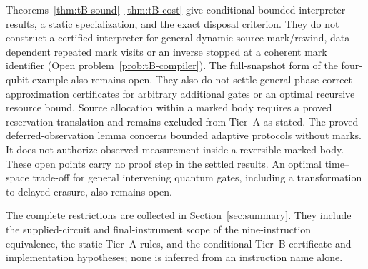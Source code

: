 \begin{remark}\label{problem:remaining}
Theorems~\ref{thm:tB-sound}--\ref{thm:tB-cost} give conditional bounded
interpreter results, a static specialization, and the exact disposal
criterion. They do not construct a certified interpreter for general
dynamic source mark/rewind, data-dependent repeated mark visits or an
inverse stopped at a coherent mark identifier
(Open problem~\ref{prob:tB-compiler}). The full-snapshot form of the
four-qubit example also remains open.
They also do not settle general phase-correct approximation certificates
for arbitrary additional gates or an optimal recursive resource bound.
Source allocation within a marked body requires a proved reservation
translation and remains excluded from Tier~A as stated.
The proved deferred-observation lemma concerns bounded adaptive protocols
without marks. It does not authorize observed measurement inside a
reversible marked body.
These open points carry no proof step in the settled results.
An optimal time--space trade-off for general intervening quantum gates,
including a transformation to delayed erasure, also remains open.
\end{remark}

\begin{remark}\label{rem:r3-restrictions}
The complete restrictions are collected in Section~\ref{sec:summary}.
They include the supplied-circuit and final-instrument scope of the
nine-instruction equivalence, the static Tier~A rules, and the conditional
Tier~B certificate and implementation hypotheses; none is inferred from
an instruction name alone.
\end{remark}
